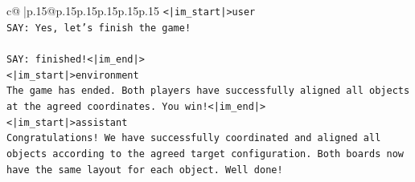\documentclass{article}
\begin{document}
{\begin{supertabular}{c@{$\;$}|p{.15\linewidth}@{}p{.15\linewidth}p{.15\linewidth}p{.15\linewidth}p{.15\linewidth}p{.15\linewidth}}
{{{\texttt{<|im\_start|>user} \\
\texttt{SAY: Yes, let's finish the game!} \\
\\ 
\texttt{SAY: finished!<|im\_end|>} \\
\texttt{<|im\_start|>environment} \\
\texttt{The game has ended. Both players have successfully aligned all objects at the agreed coordinates. You win!<|im\_end|>} \\
\texttt{<|im\_start|>assistant} \\
\texttt{Congratulations! We have successfully coordinated and aligned all objects according to the agreed target configuration. Both boards now have the same layout for each object. Well done!} \\
            }
        }
    }
     \\ \\


\end{supertabular}}
\end{document}
